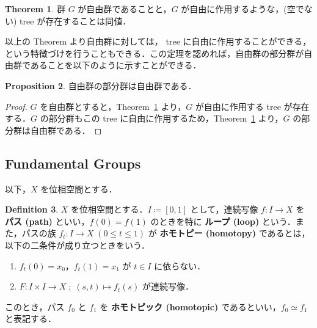 \documentclass[dvipdfmx]{ujarticle}
\DeclareMathOperator{\Cay}{Cay}
\theoremstyle{definition}
\newtheorem{dfn}{Definition}[section]
\newtheorem{thm}[dfn]{Theorem}
\newtheorem{prop}[dfn]{Proposition}
\begin{document}

\begin{thm}\label{freeactiongroup}
  群 $G$ が自由群であることと，$G$ が自由に作用するような，(空でない) tree が存在することは同値．
\end{thm}

以上の Theorem より自由群に対しては， tree に自由に作用することができる，という特徴づけを行うこともできる．この定理を認めれば，自由群の部分群が自由群であることを以下のように示すことができる．

\begin{prop}
  自由群の部分群は自由群である．
\end{prop}
\begin{proof}
  $G$ を自由群とすると，Theorem~\ref{freeactiongroup} より，$G$ が自由に作用する tree が存在する．$G$ の部分群もこの tree に自由に作用するため，Theorem~\ref{freeactiongroup} より，$G$ の部分群は自由群である．
\end{proof}


\subsection{Fundamental Groups}\label{fundamentalgroup}
以下，$X$ を位相空間とする．
\begin{dfn}\label{homotopy}
  $X$ を位相空間とする．$I\coloneqq[0,1]$ として，連続写像 $f\colon I\rightarrow X$ を \textbf{パス (path)} といい，$f(0)=f(1)$ のときを特に \textbf{ループ (loop)} という．また，パスの族 $f_t\colon I\rightarrow X\;(0\leq t\leq 1)$ が \textbf{ホモトピー (homotopy)} であるとは，以下の二条件が成り立つときをいう．
  \begin{enumerate}
    \item $f_t(0)=x_0$，$f_t(1)=x_1$ が $t\in I$ に依らない．
    \item $F\colon I\times I\rightarrow X\;;\;(s,t)\mapsto f_t(s)$ が連続写像．
  \end{enumerate}
 このとき，パス $f_0$ と $f_1$ を \textbf{ホモトピック (homotopic)} であるといい，$f_0\simeq f_1$ と表記する．
\end{dfn}
 
\end{document}

